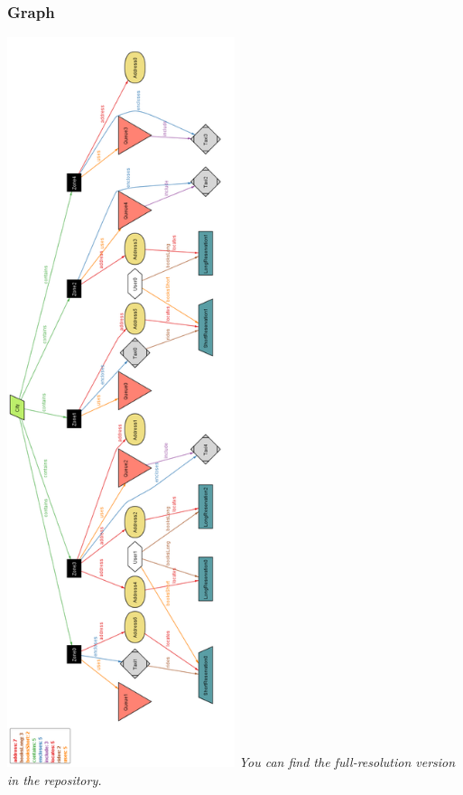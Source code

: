 	\subsubsection{Graph}
	\includegraphics[width=0.50\textwidth]{./images/alloy_graph}
	\newpage
	\emph{You can find the full-resolution version in the repository.}